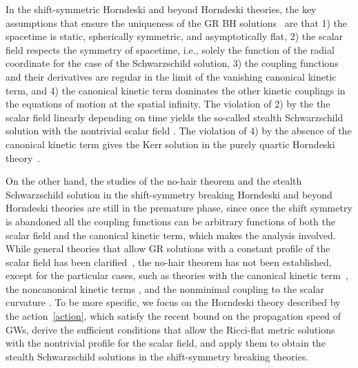 \documentclass[prd,amsmath,amssymb,floatfix,superscriptaddress,notitlepage,nofootinbib,preprintnumbers]{revtex4-1}
\begin{document}
In the shift-symmetric Horndeski and beyond Horndeski theories,
the key assumptions that ensure the uniqueness of the 
GR BH solutions~\cite{Hui:2012qt,Babichev:2017guv} 
are
that
1) the spacetime is static, spherically symmetric, and asymptotically flat,
2) the scalar field respects the symmetry of spacetime, i.e.,
solely the function of the radial coordinate for the case of the Schwarzschild solution,
3) the coupling functions and their derivatives are regular in the limit
of the vanishing canonical kinetic term,
and 
4) the canonical kinetic term dominates the other kinetic couplings
in the equations of motion at the spatial infinity.
The violation of 2) by the the scalar field linearly depending on time yields
the so-called stealth Schwarzschild solution
with the nontrivial scalar field \cite{Babichev:2013cya}.
The violation of 4)
by
the absence of the canonical kinetic term
gives the Kerr solution in the purely quartic Horndeski theory~\cite{Babichev:2017guv}.


On the other hand, 
the studies of 
the no-hair theorem and the stealth Schwarzschild solution in the shift-symmetry breaking 
Horndeski and beyond Horndeski theories
are still in the premature phase,
since once the shift symmetry is abandoned
all the coupling functions can be arbitrary functions 
of both the scalar field and the canonical kinetic term, 
which makes the analysis involved.
While general theories that allow GR solutions 
with a constant profile of the scalar field has been clarified~\cite{Motohashi:2018wdq},
the no-hair theorem has not been established, 
except for the particular cases,
such as  
theories with 
the canonical kinetic term~\cite{Bekenstein:1972ny,Bekenstein:1995un},
the noncanonical kinetic terms \cite{Graham:2014mda},
and 
the nonminimal coupling to the scalar curvature \cite{Sotiriou:2011dz,Faraoni:2017ock}.
To be more specific,
we focus on the Horndeski theory
described by the action~\eqref{action},
which satisfy the recent bound on the propagation speed of GWs,
derive the sufficient conditions
that allow the Ricci-flat metric solutions with the nontrivial profile for the scalar field,
and apply them to obtain the stealth Schwarzschild solutions 
in the shift-symmetry breaking theories. 
\end{document}
